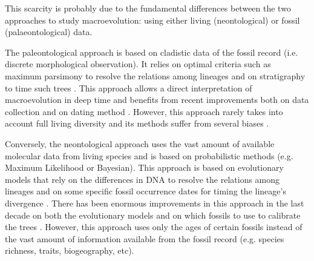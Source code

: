 
This scarcity %
is probably due to the fundamental differences between the two approaches to study macroevolution: using either living (neontological) or fossil (palaeontological) data.

The paleontological approach %
 is based on cladistic data of the fossil record (i.e. discrete morphological observation).
It relies on optimal criteria such as maximum parsimony \citep{Hennig1966,felsenstein2004} to resolve the relations among lineages and on stratigraphy to time such trees \citep{GoloboffTNT}.
This approach allows a direct interpretation of macroevolution in deep time and benefits from recent improvements both on data collection \citep[e.g. 4541 characters in][introducing the term ``phenomics'']{O'Leary08022013} and on dating method \citep[e.g. the \textit{cal3} method from][]{Bapst2014}.
However, this approach rarely takes into account full living diversity \citep[e.g. only 38 out of 351 living primates for 119 fossils in][]{ni2013oldest} and its methods suffer from several biases \citep[e.g. parsimony;][]{wrightbayesian2014}.

Conversely, the neontological approach uses the vast amount of available molecular data from living species and is based on probabilistic methods (e.g. Maximum Likelihood or Bayesian).
This approach is based on evolutionary models that rely on the differences in DNA to resolve the relations among lineages and on some specific fossil occurrence dates for timing the lineage's divergence \citep[i.e. the molecular clock;][]{zuckerkandl1965}.
There has been enormous improvements in this approach in the last decade on both the evolutionary models \citep[e.g.][]{bapsta2013,stadlerdating2013,heaththe2013} and on which fossils to use to calibrate the trees \citep{Donoghue2007424,Parham01032012}.
However, this approach uses only the ages of certain fossils instead of the vast amount of information available from the fossil record (e.g. species richness, traits, biogeography, etc).


